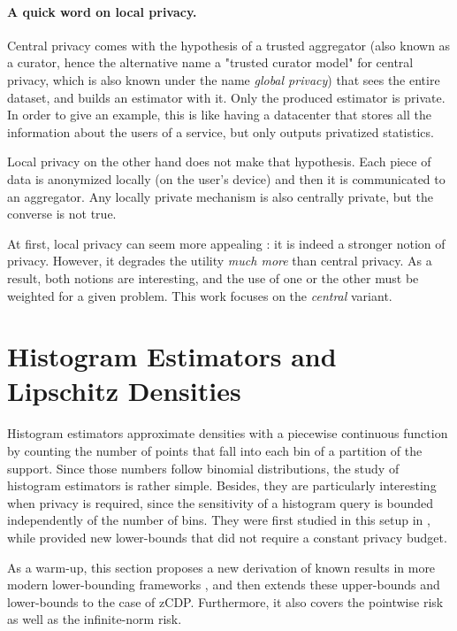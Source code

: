 \documentclass[10pt]{article} %
\newcommand\B[1]{{#1}}
\begin{document}
\paragraph{A quick word on local privacy.}

\B{Central} privacy comes with the hypothesis of a trusted aggregator \B{(also known as a curator, hence the alternative name a "trusted curator model" for central privacy, which is also known under the name {\em global privacy})} that sees the entire dataset, and builds an estimator with it. Only the produced estimator is private. In order to give an example, this is like having a datacenter that stores all the information about the users of a service, but only outputs privatized statistics.

Local privacy on the other hand does not make that hypothesis. Each piece of data is anonymized locally (on the user's device) and then it is communicated to an aggregator. Any locally private mechanism is also \B{centrally} private, but the converse is not true.

At first, local privacy can seem more appealing : it is indeed a stronger notion of privacy. However, it degrades the utility \emph{much more} than \B{central} privacy. As a result, both notions are interesting, and the use of one or the other must be weighted for a given problem. This work focuses on the \emph{\B{central}} variant.

\section{Histogram Estimators and Lipschitz Densities}
\label{sec:histogram}


Histogram estimators approximate densities with a piecewise continuous function by counting the number of points that fall into each bin of a partition of the support. Since those numbers follow binomial distributions, the study of histogram estimators is rather simple. Besides, they are particularly interesting when privacy is required, since the sensitivity %
of a histogram query is bounded independently of the number of bins. They were first studied in this setup in \citet{wasserman2010statistical}, while \citet{barber2014privacy} provided new lower-bounds that did not require a constant privacy budget.

As a warm-up, this section proposes a new derivation of known results in more modern lower-bounding frameworks \citep{acharya2021differentially,kamath2022improved,lalanne2022statistical}, and then extends these upper-bounds and lower-bounds to the case of zCDP. Furthermore, it also covers the pointwise risk as well as the infinite-norm risk.
\end{document}
